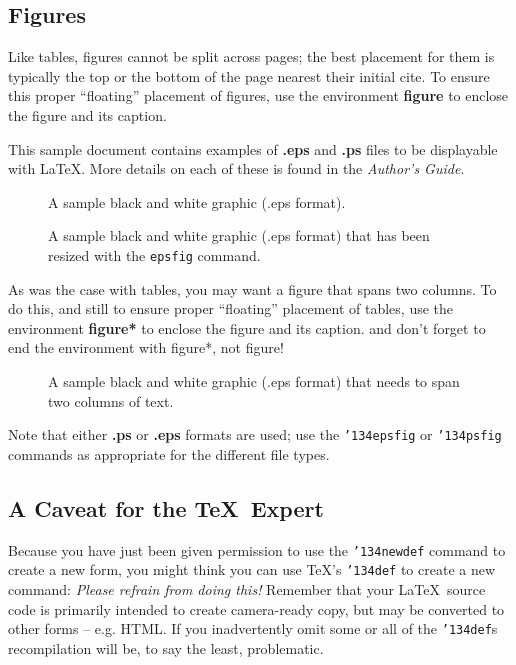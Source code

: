 \documentclass{sig-alternate}
\begin{document}
\subsection{Figures}
Like tables, figures cannot be split across pages; the
best placement for them
is typically the top or the bottom of the page nearest
their initial cite.  To ensure this proper ``floating'' placement
of figures, use the environment
\textbf{figure} to enclose the figure and its caption.

This sample document contains examples of \textbf{.eps}
and \textbf{.ps} files to be displayable with \LaTeX.  More
details on each of these is found in the \textit{Author's Guide}.

\begin{figure}
\centering
{}
\caption{A sample black and white graphic (.eps format).}
\end{figure}

\begin{figure}
\centering
{}
\caption{A sample black and white graphic (.eps format)
that has been resized with the \texttt{epsfig} command.}
\end{figure}


As was the case with tables, you may want a figure
that spans two columns.  To do this, and still to
ensure proper ``floating'' placement of tables, use the environment
\textbf{figure*} to enclose the figure and its caption.
and don't forget to end the environment with
{figure*}, not {figure}!

\begin{figure*}
\centering
{}
\caption{A sample black and white graphic (.eps format)
that needs to span two columns of text.}
\end{figure*}

Note that either {\textbf{.ps}} or {\textbf{.eps}} formats are
used; use
the \texttt{{\char'134}epsfig} or \texttt{{\char'134}psfig}
commands as appropriate for the different file types.

\subsection*{A {\secit Caveat} for the \TeX\ Expert}
Because you have just been given permission to
use the \texttt{{\char'134}newdef} command to create a
new form, you might think you can
use \TeX's \texttt{{\char'134}def} to create a
new command: \textit{Please refrain from doing this!}
Remember that your \LaTeX\ source code is primarily intended
to create camera-ready copy, but may be converted
to other forms -- e.g. HTML. If you inadvertently omit
some or all of the \texttt{{\char'134}def}s recompilation will
be, to say the least, problematic.
\end{document}
